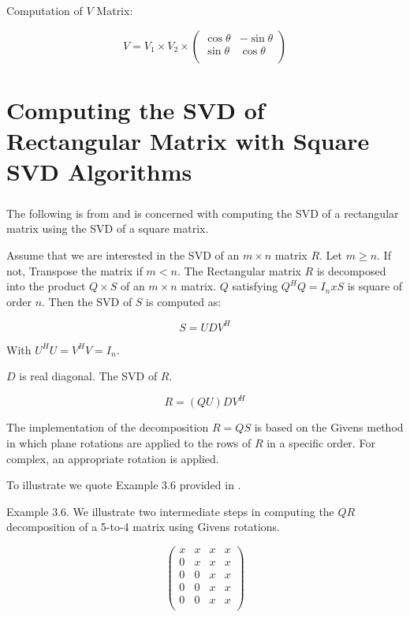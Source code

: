 Computation of $V$ Matrix:

\begin{equation}
V=V_1 \times V_2 \times
\left(
      \begin{array}{cc}
       \cos \theta   & -\sin \theta \\
        \sin \theta & \cos \theta  \\
     \end{array}
   \right)
\end{equation}

\chapter{Computing the SVD of Rectangular Matrix with Square SVD Algorithms}


\paragraph{}
The following is from \cite{Delosme} and is concerned with computing the SVD of a rectangular matrix using the SVD of a square matrix.

Assume that we are interested in the SVD of an $m \times n$ matrix $R$. Let $m \geq  n$. If not, Transpose the matrix if $m < n$. The Rectangular matrix $R$ is decomposed into the product $Q \times S$ of an $m  \times  n$ matrix. $Q$ satisfying $Q^H Q = I_n x S$ is square of order $n$. Then the SVD of $S$ is computed as:

\begin{equation}
S=U D V^H
\end{equation}

 With $U^HU=V^HV=I_n$.
 
 $D$ is real diagonal. The SVD of $R$.
 
 
 
 \begin{equation}
R=(QU)DV^H
\end{equation}

The implementation of the decomposition $R = QS$ is based on the Givens method in which plane rotations are applied to the rows of $R$ in a specific order. For complex, an appropriate rotation is applied.

To illustrate we quote Example 3.6  provided in \cite{Demmel}.

Example 3.6. We illustrate two intermediate steps in computing the $QR$ decomposition of a 5-to-4 matrix using Givens rotations.

\begin{equation}
\left(
  \begin{array}{cccc}
    x & x & x & x \\
    0 & x & x & x \\
    0 & 0 & x & x \\
    0 & 0 & x & x \\
    0 & 0 & x & x \\
  \end{array}
\right)
\end{equation}


